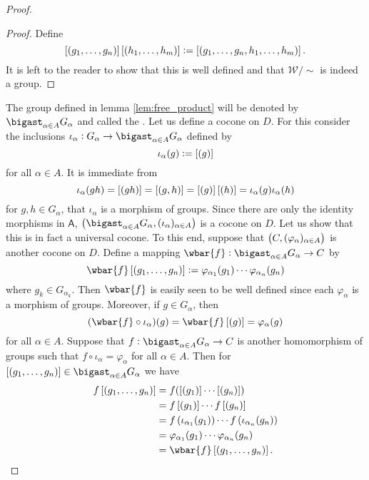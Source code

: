 \begin{proof}
	\begin{proof}
		Define
		\begin{equation*}
			\sbr[0]{(g_1,\dots,g_n)}\sbr[0]{(h_1,\dots,h_m)} := \sbr[0]{(g_1,\dots,g_n,h_1,\dots,h_m)}.
		\end{equation*}
		It is left to the reader to show that this is well defined and that $\mathcal{W}/{\sim}$ is indeed a group.
	\end{proof}

	The group defined in lemma \ref{lem:free_product} will be denoted by $\bigast_{\alpha \in A}G_\alpha$ and called the . Let us define a cocone on $D$. For this consider the inclusions $\iota_\alpha : G_\alpha \to \bigast_{\alpha \in A}G_\alpha$ defined by
	\begin{equation*}
		\iota_\alpha(g) := \sbr[0]{(g)}
	\end{equation*}
	\noindent for all $\alpha \in A$. It is immediate from
	\begin{equation*}
		\iota_\alpha(gh) = \sbr[0]{(gh)} = \sbr[0]{(g,h)} = \sbr[0]{(g)}\sbr[0]{(h)} = \iota_\alpha(g)\iota_\alpha(h)
	\end{equation*}
	\noindent for $g,h \in G_\alpha$, that $\iota_\alpha$ is a morphism of groups. Since there are only the identity morphisms in $\mathsf{A}$, $\del[1]{\bigast_{\alpha \in A}G_\alpha, (\iota_\alpha)_{\alpha \in A}}$ is a cocone on $D$. Let us show that this is in fact a universal cocone. To this end, suppose that $\del[1]{C,(\varphi_\alpha)_{\alpha \in A}}$ is another cocone on $D$. Define a mapping $\wbar{f} : \bigast_{\alpha \in A}G_\alpha \to C$ by
	\begin{equation*}
		\wbar{f}\sbr[0]{(g_1,\dots,g_n)} := \varphi_{\alpha_1}(g_1)\cdots \varphi_{\alpha_n}(g_n)
	\end{equation*}
	\noindent where $g_k \in G_{\alpha_k}$. Then $\wbar{f}$ is easily seen to be well defined since each $\varphi_\alpha$ is  a morphism of groups. Moreover, if $g \in G_\alpha$, then
	\begin{equation*}
		(\wbar{f} \circ \iota_\alpha)(g) = \wbar{f}\sbr[0]{(g)} = \varphi_\alpha(g)
	\end{equation*}
	\noindent for all $\alpha \in A$. Suppose that $f : \bigast_{\alpha \in A}G_\alpha \to C$ is another homomorphism of groups such that $f \circ \iota_\alpha = \varphi_\alpha$ for all $\alpha \in A$. Then for $\sbr[0]{(g_1,\dots,g_n)} \in \bigast_{\alpha \in A} G_\alpha$ we have
	\begin{align*}
		f\sbr[0]{(g_1,\dots,g_n)} &= f(\sbr[0]{(g_1)} \cdots \sbr[0]{(g_n)})\\
		&= f\sbr[0]{(g_1)} \cdots f\sbr[0]{(g_n)}\\
		&= f\del[0]{\iota_{\alpha_1}(g_1)} \cdots f\del[0]{\iota_{\alpha_n}(g_n)}\\
		&= \varphi_{\alpha_1}(g_1)\cdots \varphi_{\alpha_n}(g_n)\\
		&= \wbar{f}\sbr[0]{(g_1,\dots,g_n)}.
	\end{align*}
\end{proof}

